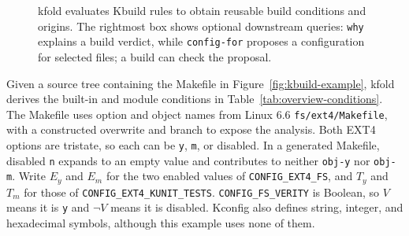 \documentclass[acmsmall]{acmart}
\newcommand{\tool}{\textsf{kfold}\xspace}
\newcounter{none}
\begin{document}
\begin{figure}[H]
\centering
{}
\caption{\tool evaluates Kbuild rules to obtain reusable build conditions and origins.
The rightmost box shows optional downstream queries: \texttt{why} explains a build verdict, while \texttt{config-for} proposes a configuration for selected files; a build can check the proposal.}
\label{fig:overview-pipeline}
\end{figure}

Given a source tree containing the Makefile in Figure~\ref{fig:kbuild-example}, \tool derives the built-in and module conditions in Table~\ref{tab:overview-conditions}.
The Makefile uses option and object names from Linux 6.6 \texttt{fs/ext4/Makefile}, with a constructed overwrite and branch to expose the analysis.
Both EXT4 options are tristate, so each can be \texttt{y}, \texttt{m}, or disabled.
In a generated Makefile, disabled \texttt{n} expands to an empty value and contributes to neither \texttt{obj-y} nor \texttt{obj-m}.
Write $E_y$ and $E_m$ for the two enabled values of \texttt{CONFIG\_EXT4\_FS}, and $T_y$ and $T_m$ for those of \texttt{CONFIG\_EXT4\_KUNIT\_TESTS}.
\texttt{CONFIG\_FS\_VERITY} is Boolean, so $V$ means it is \texttt{y} and $\neg V$ means it is disabled.
Kconfig also defines string, integer, and hexadecimal symbols, although this example uses none of them.
\end{document}
